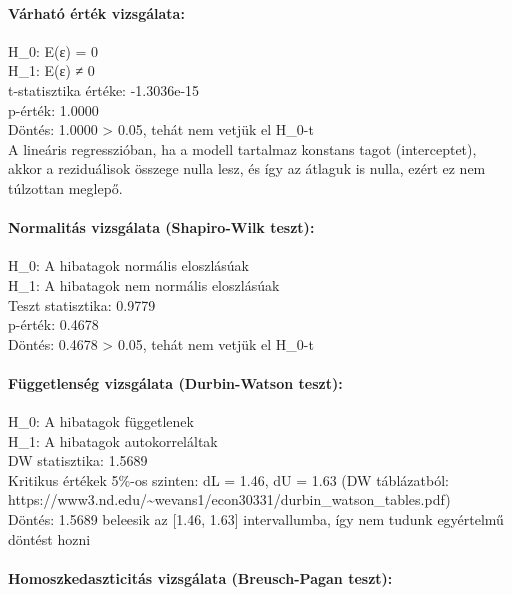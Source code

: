 \documentclass[11pt]{article}
\begin{document}
\paragraph{Várható érték
vizsgálata:}\label{vuxe1rhatuxf3-uxe9rtuxe9k-vizsguxe1lata}

H\_0: E(ε) = 0\\
H\_1: E(ε) ≠ 0\\
t-statisztika értéke: -1.3036e-15\\
p-érték: 1.0000\\
Döntés: 1.0000 \textgreater{} 0.05, tehát nem vetjük el H\_0-t\\
A lineáris regresszióban, ha a modell tartalmaz konstans tagot
(interceptet), akkor a reziduálisok összege nulla lesz, és így az
átlaguk is nulla, ezért ez nem túlzottan meglepő.

\paragraph{Normalitás vizsgálata (Shapiro-Wilk
teszt):}\label{normalituxe1s-vizsguxe1lata-shapiro-wilk-teszt}

H\_0: A hibatagok normális eloszlásúak\\
H\_1: A hibatagok nem normális eloszlásúak\\
Teszt statisztika: 0.9779\\
p-érték: 0.4678\\
Döntés: 0.4678 \textgreater{} 0.05, tehát nem vetjük el H\_0-t

\paragraph{Függetlenség vizsgálata (Durbin-Watson
teszt):}\label{fuxfcggetlensuxe9g-vizsguxe1lata-durbin-watson-teszt}

H\_0: A hibatagok függetlenek\\
H\_1: A hibatagok autokorreláltak\\
DW statisztika: 1.5689\\
Kritikus értékek 5\%-os szinten: dL = 1.46, dU = 1.63 (DW táblázatból:
https://www3.nd.edu/\textasciitilde wevans1/econ30331/durbin\_watson\_tables.pdf)\\
Döntés: 1.5689 beleesik az {[}1.46, 1.63{]} intervallumba, így nem
tudunk egyértelmű döntést hozni

\paragraph{Homoszkedaszticitás vizsgálata (Breusch-Pagan
teszt):}\label{homoszkedaszticituxe1s-vizsguxe1lata-breusch-pagan-teszt}
\end{document}

